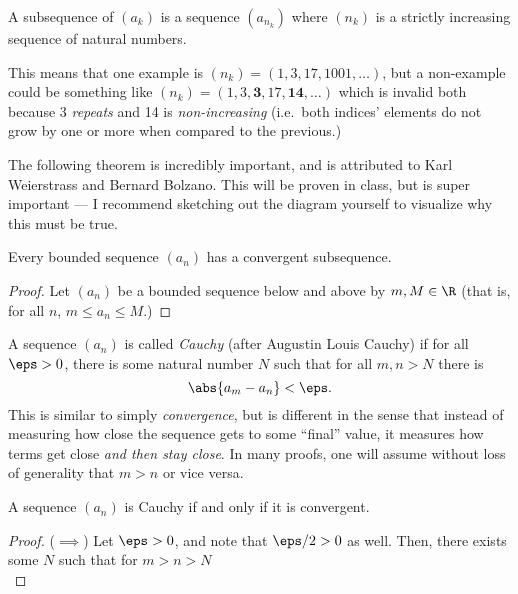 \documentclass{article}
\begin{document}
\begin{defn}[Subsequence]\label{defn:subsequence}
  A subsequence of $(a_{k})$ is a sequence $(a_{n_{k}})$ where $(n_{k})$
  is a strictly increasing sequence of natural numbers.
\end{defn}

This means that one example is $(n_{k}) = (1, 3, 17, 1001, \ldots)$, but a non-example
could be something like $(n_{k}) = (1, 3, \bm{3}, 17, \bm{14}, \ldots)$ which is invalid both because 3 \emph{repeats} and
14 is \emph{non-increasing} (i.e.\ both indices' elements do not grow by one or more when compared to the previous.)

The following theorem is incredibly important, and is attributed to Karl Weierstrass and Bernard Bolzano.
This will be proven in class, but is super important --- I recommend sketching out the diagram yourself to visualize why this
must be true.
\begin{theorem}\label{thm:bolzano-weierstrass}
  Every bounded sequence $(a_{n})$ has a convergent subsequence.
\end{theorem}
\begin{proof}
  Let $(a_{n})$ be a bounded sequence below and above by $m, M \in \R$ (that is, for all $n$, $m \le a_{n} \le M$.)
\end{proof}

\begin{defn}\label{defn:cauchy}
  A sequence $(a_{n})$ is called \emph{Cauchy} (after Augustin Louis Cauchy) if
  for all $\eps > 0$, there is some natural number $N$ such that for all $m, n > N$ there is
  \[ \abs{a_{m} - a_{n}} < \eps. \]
  This is similar to simply \emph{convergence}, but is different in the sense that
  instead of measuring how close the sequence gets to some ``final'' value, it measures
  how terms get close \emph{and then stay close}.
  In many proofs, one will assume without loss of generality that $m > n$ or vice versa.
\end{defn}

\begin{theorem}\label{thm:cauchy-iff-convergent}
  A sequence $(a_{n})$ is Cauchy if and only if it is convergent.
\end{theorem}
\begin{proof}
  ($\implies$) Let $\eps > 0$, and note that $\eps/2 > 0$ as well. Then, there exists some $N$ such that for $m > n > N$
  \[  \]
\end{proof}
\end{document}
